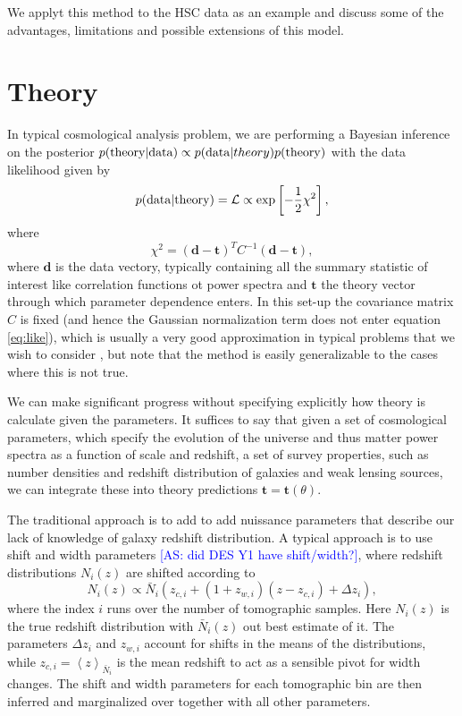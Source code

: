\documentclass[a4paper,11pt]{article}
\newcommand{\as}[1]{{\textcolor{blue}{[AS: #1]}}}
\newcommand{\vd}{\mathbf{d}}
\newcommand{\vt}{\mathbf{t}}
\begin{document}
We applyt this method to the HSC data as an example and  discuss some of the advantages, limitations and possible extensions of this model. 




\section{Theory}

In typical cosmological analysis problem, we are performing a Bayesian inference on the posterior $p({\rm theory} | {\rm data} ) \propto p({\rm data}|{\rm} theory) p({\rm theory})$ with the data likelihood given by 
\begin{equation}
p({\rm data}|{\rm theory}) =  \mathcal{L} \propto  \exp\left [-\frac{1}{2} \chi^2 \right], \label{eq:like}
\end{equation}
where
\begin{equation}
  \chi^2  = (\vd-\vt)^T C^{-1} (\vd-\vt),
\end{equation}
where $\vd$ is the data vectory, typically containing all the summary statistic of interest like correlation functions ot power spectra and $\vt$ the theory vector through which parameter dependence enters. In this set-up the covariance matrix $C$ is fixed (and hence the Gaussian normalization term does not enter equation \ref{eq:like}), which is usually a very good approximation in typical problems that we wish to consider \cite{1811.11584}, but note that the method is easily generalizable to the cases where this is not true.

We can make significant progress without specifying explicitly how theory is calculate given the parameters. It suffices to say that given a set of cosmological parameters, which specify the evolution of the universe and thus matter power spectra as a function of scale and redshift, a set of survey properties, such as number densities and redshift distribution of galaxies and weak lensing sources, we can integrate these into theory predictions $\vt=\vt(\theta)$.

The traditional approach is to add to add nuissance parameters that describe our lack of knowledge of galaxy redshift distribution. A typical approach is to use shift and width parameters  \cite{1706.09359,1912.08209} \as{did DES Y1 have shift/width?},
where redshift distributions $N_i(z)$ are shifted according to
    \begin{equation}
      N_{i}(z) \propto \bar{N}_{i}\left(z_{c,i} + (1 + z_{w, i})(z-z_{c, i}) + \Delta z_{i}\right),
      \label{eq:photo-z-model}
    \end{equation} 
where the index $i$ runs over the number of tomographic samples. Here $N_{i}(z)$ is the true redshift distribution with  $\bar{N}_{i}(z)$ out best estimate of it. The parameters $\Delta z_{i}$ and $z_{w,i}$ account for shifts in the means of the distributions, while $z_{c,i} = \left<z\right>_{\bar{N}_i}$ is the mean redshift to act as a sensible pivot for width changes. The shift and width parameters for each tomographic bin are then inferred and marginalized over together with all other parameters.
    
\end{document}
